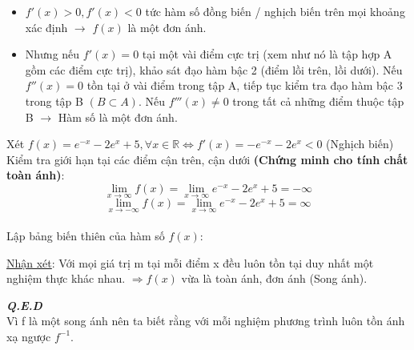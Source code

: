 \documentclass[a4paper]{exam}
\begin{document}
	\begin{itemize}
		\item $f'(x) > 0, f'(x) < 0$ tức hàm số đồng biến / nghịch biến trên mọi khoảng xác định $\longrightarrow$ $f(x)$ là một đơn ánh.
		\item Nhưng nếu $f'(x) = 0$ tại một vài điểm cực trị (xem như nó là tập hợp A gồm các điểm cực trị), khảo sát đạo hàm bậc 2 (điểm lồi trên, lồi dưới). Nếu $f''(x) = 0$ tồn tại ở vài điểm trong tập A, tiếp tục kiểm tra đạo hàm bậc 3 trong tập B $(B \subset A)$. Nếu $f'''(x) \neq 0$ trong tất cả những điểm thuộc tập B $\longrightarrow$ Hàm số là một đơn ánh.
		
	\end{itemize}
	
	Xét $f(x) = e^{-x} - 2e^{x} + 5, \forall x \in \mathbb{R} \iff f'(x) = -e^{-x} - 2e^{x} < 0$ (Nghịch biến)\\
	
	Kiểm tra giới hạn tại các điểm cận trên, cận dưới \textbf{(Chứng minh cho tính chất toàn ánh)}:\\ 
	$$ \lim_{x \to \infty} f(x) = \lim_{x \to \infty} e^{-x} - 2e^{x} + 5 = -\infty $$
	$$ \lim_{x \to -\infty} f(x) = \lim_{x \to \infty} e^{-x} - 2e^{x} + 5 = \infty $$\\
	
	Lập bảng biến thiên của hàm số $f(x)$:\\
	\begin{center}
		
		
	\end{center}
	
	\underline{Nhận xét}: Với mọi giá trị m tại mỗi điểm x đều luôn tồn tại duy nhất một nghiệm thực khác nhau. 
	$\Longrightarrow f(x)$ vừa là toàn ánh, đơn ánh (Song ánh).
	
	\hspace*{0pt}\hfill \textit{\textbf{Q.E.D}}\\
	
	Vì f là một song ánh nên ta biết rằng với mỗi nghiệm phương trình luôn tồn ánh xạ ngược $f^{-1}$.\\
	
\end{document}
